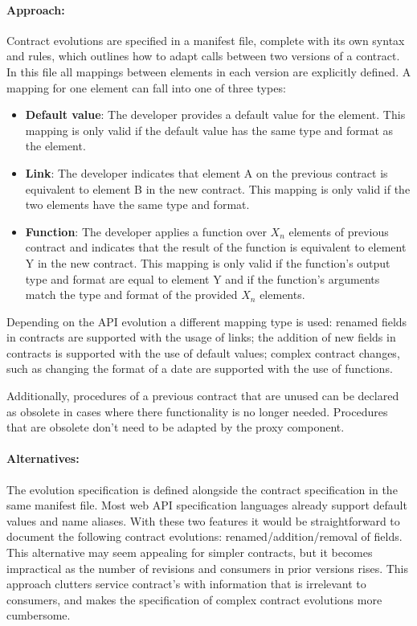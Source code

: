 \paragraph{Approach:}
Contract evolutions are specified in a manifest file, complete with its own syntax and rules,
which outlines how to adapt calls between two versions of a contract.
In this file all mappings between elements in each version are explicitly defined.
A mapping for one element can fall into one of three types:
\begin{itemize}
    \setlength\itemsep{0em}
    \item \textbf{Default value}: The developer provides a default value for the element.
    This mapping is only valid if the default value has the same type and format as the element.
    \item \textbf{Link}: The developer indicates that element A on the previous contract is equivalent to element B in the new contract.
    This mapping is only valid if the two elements have the same type and format.
    \item \textbf{Function}: The developer applies a function over $X_{n}$ elements of previous contract and indicates that the result of the function is equivalent to element Y in the new contract.
    This mapping is only valid if the function's output type and format are equal to element Y and if the function's arguments match the type and format of the provided  $X_{n}$ elements.
\end{itemize}
Depending on the API evolution a different mapping type is used:
renamed fields in contracts are supported with the usage of links;
the addition of new fields in contracts is supported with the use of default values;
complex contract changes, such as changing the format of a date are supported with the use of functions.

Additionally, procedures of a previous contract that are unused can be declared as obsolete in cases where there functionality is no longer needed.
Procedures that are obsolete don't need to be adapted by the proxy component.

\paragraph{Alternatives:}
The evolution specification is defined alongside the contract specification in the same manifest file.
Most web API specification languages already support default values and name aliases.
With these two features it would be straightforward
to document the following contract evolutions: renamed/addition/removal of fields.
This alternative may seem appealing for simpler contracts, but it becomes impractical as the number of revisions and consumers in prior versions rises.
This approach clutters service contract's with information that is irrelevant to consumers, and makes the specification of complex contract evolutions more cumbersome.


